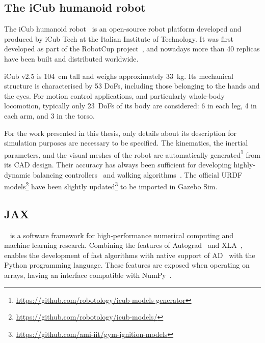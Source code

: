 \subsection{The iCub humanoid robot}

The iCub humanoid robot~\parencite{natale_icub_2017} is an open-source robot platform developed and produced by iCub Tech at the Italian Institute of Technology.
It was first developed as part of the RobotCup project~\parencite{metta_open_2005}, and nowadays more than 40 replicas have been built and distributed worldwide.

iCub v2.5 is 104~cm tall and weighs approximately 33~kg.
Its mechanical structure is characterised by 53 \acp{DoF}, including those belonging to the hands and the eyes.
For motion control applications, and particularly whole-body locomotion, typically only 23~\acp{DoF} of its body are considered: 6 in each leg, 4 in each arm, and 3 in the torso.

For the work presented in this thesis, only details about its description for simulation purposes are necessary to be specified.
The kinematics, the inertial parameters, and the visual meshes of the robot are automatically generated\footnote{\url{https://github.com/robotology/icub-models-generator}} from its CAD design.
Their accuracy has always been sufficient for developing highly-dynamic balancing controllers~\parencite{pucci_highly_2016} and walking algorithms~\parencite{dafarra_control_2018}.
The official \ac{URDF} models\footnote{\url{https://github.com/robotology/icub-models/}} have been slightly updated\footnote{\url{https://github.com/ami-iit/gym-ignition-models}} to be imported in Gazebo Sim.

\subsection{JAX}

\jax~\parencite{frostig_compiling_2018, bradbury_james_jax_2018} is a software framework for high-performance numerical computing and machine learning research.
Combining the features of Autograd~\parencite{maclaurin_autograd_2015} and \ac{XLA}~\parencite{sabne_xla_2020}, \jax enables the development of fast algorithms with native support of \ac{AD}~\parencite{baydin_automatic_2018} with the Python programming language.
These features are exposed when operating on \jax arrays, having an interface compatible with NumPy~\parencite{harris_array_2020}.

